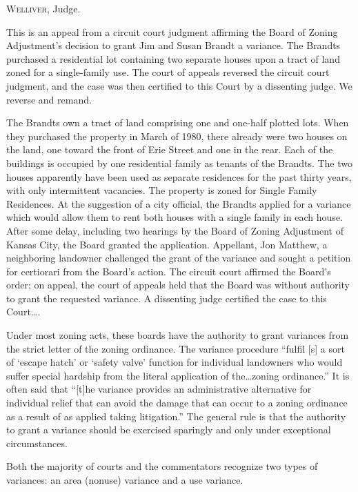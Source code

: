 

\opinion \textsc{Welliver}, Judge.

This is an appeal from a circuit court judgment affirming the Board of Zoning
Adjustment's decision to grant Jim and Susan Brandt a variance. The Brandts
purchased a residential lot containing two separate houses upon a tract of land
zoned for a single-family use. The court of appeals reversed the circuit court
judgment, and the case was then certified to this Court by a dissenting judge.
We reverse and remand. 

The Brandts own a tract of land comprising one and one-half plotted lots. When
they purchased the property in March of 1980, there already were two houses on
the land, one toward the front of Erie Street and one in the rear. Each of the
buildings is occupied by one residential family as tenants of the Brandts. The
two houses apparently have been used as separate residences for the past thirty
years, with only intermittent vacancies. The property is zoned for Single Family
Residences. At the suggestion of a city official, the Brandts applied for a
variance which would allow them to rent both houses with a single family in each
house. After some delay, including two hearings by the Board of Zoning
Adjustment of Kansas City, the Board granted the application. Appellant, Jon
Matthew, a neighboring landowner challenged the grant of the variance and sought
a petition for certiorari from the Board's action. The circuit court affirmed
the Board's order; on appeal, the court of appeals held that the Board was
without authority to grant the requested variance. A dissenting judge certified
the case to this Court\ldots .

Under most zoning acts, these boards have the authority to grant variances from
the strict letter of the zoning ordinance. The variance procedure ``fulfil [s] a
sort of `escape hatch' or `safety valve' function for individual landowners who
would suffer special hardship from the literal application of the\ldots zoning
ordinance.'' It is often said that ``[t]he variance provides an administrative
alternative for individual relief that can avoid the damage that can occur to a
zoning ordinance as a result of as applied taking litigation.'' The general rule
is that the authority to grant a variance should be exercised sparingly and only
under exceptional circumstances. 

Both the majority of courts and the commentators recognize two types of
variances: an area (nonuse) variance and a use variance.

